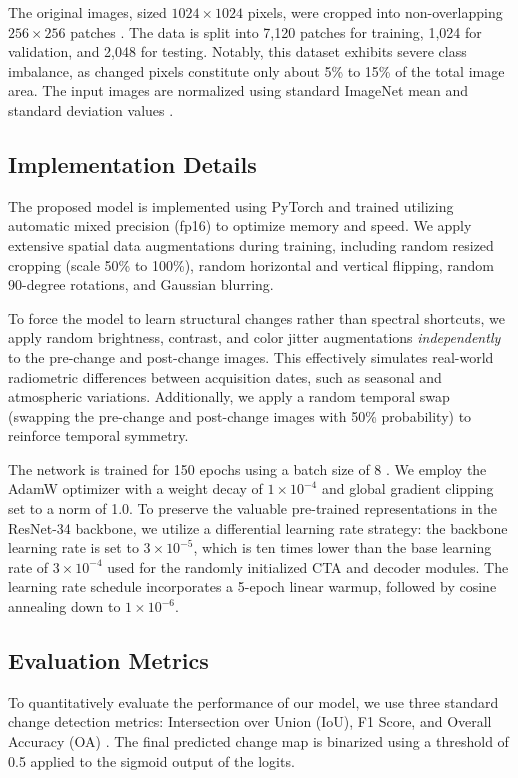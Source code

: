 \documentclass[conference]{IEEEtran}
\begin{document}
The original images, sized $1024 \times 1024$ pixels, were cropped into non-overlapping $256 \times 256$ patches . The data is split into 7,120 patches for training, 1,024 for validation, and 2,048 for testing. Notably, this dataset exhibits severe class imbalance, as changed pixels constitute only about 5\% to 15\% of the total image area. The input images are normalized using standard ImageNet mean and standard deviation values .

\subsection{Implementation Details}
The proposed model is implemented using PyTorch and trained utilizing automatic mixed precision (fp16) to optimize memory and speed. We apply extensive spatial data augmentations during training, including random resized cropping (scale 50\% to 100\%), random horizontal and vertical flipping, random 90-degree rotations, and Gaussian blurring. 

To force the model to learn structural changes rather than spectral shortcuts, we apply random brightness, contrast, and color jitter augmentations \textit{independently} to the pre-change and post-change images. This effectively simulates real-world radiometric differences between acquisition dates, such as seasonal and atmospheric variations. Additionally, we apply a random temporal swap (swapping the pre-change and post-change images with 50\% probability) to reinforce temporal symmetry.

The network is trained for 150 epochs using a batch size of 8 . We employ the AdamW optimizer with a weight decay of $1 \times 10^{-4}$ and global gradient clipping set to a norm of 1.0. To preserve the valuable pre-trained representations in the ResNet-34 backbone, we utilize a differential learning rate strategy: the backbone learning rate is set to $3 \times 10^{-5}$, which is ten times lower than the base learning rate of $3 \times 10^{-4}$ used for the randomly initialized CTA and decoder modules. The learning rate schedule incorporates a 5-epoch linear warmup, followed by cosine annealing down to $1 \times 10^{-6}$.

\subsection{Evaluation Metrics}
To quantitatively evaluate the performance of our model, we use three standard change detection metrics: Intersection over Union (IoU), F1 Score, and Overall Accuracy (OA) . The final predicted change map is binarized using a threshold of 0.5 applied to the sigmoid output of the logits. 
\end{document}
